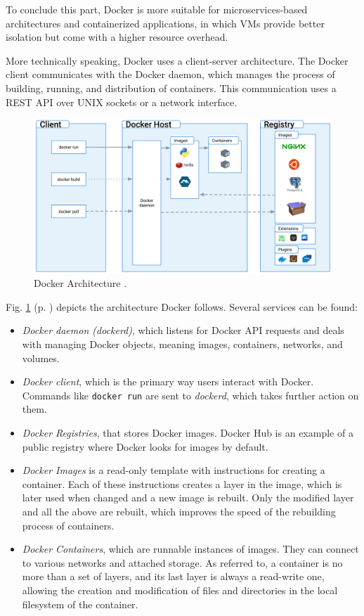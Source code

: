 To conclude this part, Docker is more suitable for microservices-based architectures and containerized applications, in which VMs provide better isolation but come with a higher resource overhead.

More technically speaking, Docker uses a client-server architecture. The Docker client communicates with the Docker daemon, which manages the process of building, running, and distribution of containers. This communication uses a REST API over UNIX sockets or a network interface. 

\begin{figure}[H]
    \includegraphics[width=12cm]{figures/docker_architecture.png}
    \caption{Docker Architecture \cite{docker_architecture_ref}.}
    \label{fig:docker_architecture}
\end{figure}

Fig. \ref{fig:docker_architecture} (p. \pageref{fig:docker_architecture}) depicts the architecture Docker follows. Several services can be found:

\begin{itemize}
    \item \textit{Docker daemon (dockerd)}, which listens for Docker API requests and deals with managing Docker objects, meaning images, containers, networks, and volumes.
    \item \textit{Docker client}, which is the primary way users interact with Docker. Commands like \texttt{docker run} are sent to \textit{dockerd}, which takes further action on them.
    \item \textit{Docker Registries}, that stores Docker images. Docker Hub is an example of a public registry where Docker looks for images by default.
    \item \textit{Docker Images} is a read-only template with instructions for creating a container. Each of these instructions creates a layer in the image, which is later used when changed and a new image is rebuilt. Only the modified layer and all the above are rebuilt, which improves the speed of the rebuilding process of containers.
    \item \textit{Docker Containers}, which are runnable instances of images. They can connect to various networks and attached storage. As referred to, a container is no more than a set of layers, and its last layer is always a read-write one, allowing the creation and modification of files and directories in the local filesystem of the container.
\end{itemize}

